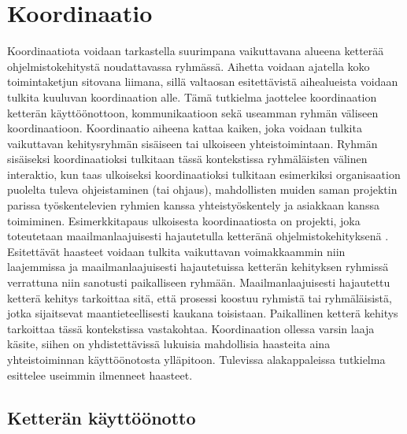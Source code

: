 \chapter{Koordinaatio}

Koordinaatiota voidaan tarkastella suurimpana vaikuttavana alueena ketterää ohjelmistokehitystä noudattavassa ryhmässä. Aihetta voidaan ajatella koko toimintaketjun sitovana liimana, sillä valtaosan esitettävistä aihealueista voidaan tulkita kuuluvan koordinaation alle. Tämä tutkielma jaottelee koordinaation ketterän käyttöönottoon, kommunikaatioon sekä useamman ryhmän väliseen koordinaatioon. Koordinaatio aiheena kattaa kaiken, joka voidaan tulkita vaikuttavan kehitysryhmän sisäiseen tai ulkoiseen yhteistoimintaan. Ryhmän sisäiseksi koordinaatioksi tulkitaan tässä kontekstissa ryhmäläisten välinen interaktio, kun taas ulkoiseksi koordinaatioksi tulkitaan esimerkiksi organisaation puolelta tuleva ohjeistaminen (tai ohjaus), mahdollisten muiden saman projektin parissa työskentelevien ryhmien kanssa yhteistyöskentely ja asiakkaan kanssa toimiminen. Esimerkkitapaus ulkoisesta koordinaatiosta on projekti, joka toteutetaan maailmanlaajuisesti hajautetulla ketteränä ohjelmistokehityksenä \cite{ALZOUBI201622}. Esitettävät haasteet voidaan tulkita vaikuttavan voimakkaammin niin laajemmissa ja maailmanlaajuisesti hajautetuissa ketterän kehityksen ryhmissä verrattuna niin sanotusti paikalliseen ryhmään. Maailmanlaajuisesti hajautettu ketterä kehitys tarkoittaa sitä, että prosessi koostuu ryhmistä tai ryhmäläisistä, jotka sijaitsevat maantieteellisesti kaukana toisistaan. Paikallinen ketterä kehitys tarkoittaa tässä kontekstissa vastakohtaa. Koordinaation ollessa varsin laaja käsite, siihen on yhdistettävissä lukuisia mahdollisia haasteita aina yhteistoiminnan käyttöönotosta ylläpitoon. Tulevissa alakappaleissa tutkielma esittelee useimmin ilmenneet haasteet.



\section{Ketterän käyttöönotto}

